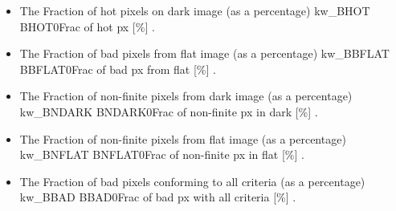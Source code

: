 \begin{itemize}

	\item {}
	{The Fraction of hot pixels on dark image (as a percentage)}
	{kw\_BHOT}
	{BHOT}{0}{Frac of hot px [\%]}
	{\calbadpix}{\spirouKeywords}{\calbadpix.\progMAIN}


	\item {}
	{The Fraction of bad pixels from flat image (as a percentage)}
	{kw\_BBFLAT}
	{BBFLAT}{0}{Frac of bad px from flat [\%]}
	{\calbadpix}{\spirouKeywords}{\calbadpix.\progMAIN}


	\item {}
	{The Fraction of non-finite pixels from dark image (as a percentage)}
	{kw\_BNDARK}
	{BNDARK}{0}{Frac of non-finite px in dark [\%]}
	{\calbadpix}{\spirouKeywords}{\calbadpix.\progMAIN}


	\item {}
	{The Fraction of non-finite pixels from flat image (as a percentage)}
	{kw\_BNFLAT}
	{BNFLAT}{0}{Frac of non-finite px in flat [\%]}
	{\calbadpix}{\spirouKeywords}{\calbadpix.\progMAIN}


	\item {}
	{The Fraction of bad pixels conforming to all criteria (as a percentage)}
	{kw\_BBAD}
	{BBAD}{0}{Frac of bad px with all criteria [\%]}
	{\calbadpix}{\spirouKeywords}{\calbadpix.\progMAIN}

\end{itemize}